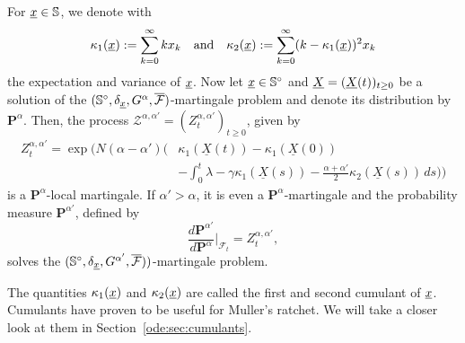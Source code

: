 \begin{Proposition} \label{da:p:com}
For  $\underline{x} \in \mathbb{S}$, we denote with
\begin{align}\label{da:eq:kappa12}
\kappa_1(\underline{x}) := \sum_{k=0}^\infty k x_k \quad \text{and} \quad
\kappa_2(\underline{x}) := \sum_{k=0}^\infty (k - \kappa_1(\underline x))^2 x_k
\end{align}
the expectation and variance of $\underline{x}$. 
Now let $\underline{x} \in \mathbb{S}^\circ$ and $\underline{X} = (\underline{X} \! \left( t \right))_{t\geq 0}$ be a solution of the
$(\mathbb{S}^\circ, \delta_{\underline x}, G^{\alpha}, \overline{\mathcal{F}})$-martingale problem and denote its
distribution by $\mathbf{P}^\alpha$. Then, the process $\mathcal Z^{\alpha,\alpha'} =
(Z^{\alpha,\alpha'}_t)_{t\geq 0}$, given by
\begin{equation}
\begin{aligned}\label{da:eq:Zt}
Z^{\alpha,\alpha'}_t = \exp \! \Big( N(\alpha - \alpha')
\Big(&\kappa_1(\underline X(t)) - \kappa_1(\underline X(0)) \\
& %
- \int_0^t \lambda - \gamma \kappa_1(\underline X(s)) - \frac{\alpha + \alpha'}{2}
\kappa_2(\underline X(s)) \, ds \Big)\!\Big)
\end{aligned}
\end{equation}
is a $\mathbf P^\alpha$-local martingale. If $\alpha'>\alpha$, it is even a $\mathbf
P^\alpha$-martingale and the probability measure $\mathbf P^{\alpha'}$, defined by
$$ \frac{d \mathbf P^{\alpha'}}{d \mathbf P^\alpha}\Big|_{\mathcal F_t} = Z^{\alpha,\alpha'}_t,$$
solves the $(\mathbb{S}^\circ, \delta_{\underline x}, G^{\alpha'}, \overline{\mathcal F}))$-martingale problem.
\end{Proposition}

\begin{Remark}
The quantities $\kappa_1(\underline{x})$ and $\kappa_2(\underline{x})$ are called the
first and second cumulant of $\underline{x}$. Cumulants have proven to be useful
for Muller's ratchet. We will take a closer look at them in Section~\ref{ode:sec:cumulants}.
\end{Remark}

